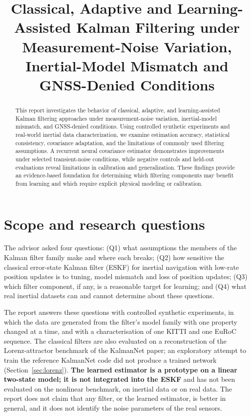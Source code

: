 \documentclass[11pt,a4paper]{article}
\title{Classical, Adaptive and Learning-Assisted Kalman Filtering under Measurement-Noise
Variation, Inertial-Model Mismatch and GNSS-Denied Conditions}
\author{}
\date{}
\begin{document}
\maketitle

\begin{abstract}
This report investigates the behavior of classical, adaptive, and learning-assisted Kalman
filtering approaches under measurement-noise variation, inertial-model mismatch, and GNSS-denied
conditions. Using controlled synthetic experiments and real-world inertial data characterization,
we examine estimation accuracy, statistical consistency, covariance adaptation, and the
limitations of commonly used filtering assumptions. A recurrent neural covariance estimator
demonstrates improvements under selected transient-noise conditions, while negative controls and
held-out evaluations reveal limitations in calibration and generalization. These findings
provide an evidence-based foundation for determining which filtering components may benefit from
learning and which require explicit physical modeling or calibration.
\end{abstract}

\section{Scope and research questions}\label{sec:scope}

The advisor asked four questions: (Q1) what assumptions the members of the Kalman filter family
make and where each breaks; (Q2) how sensitive the classical error-state Kalman filter (ESKF) for
inertial navigation with low-rate position updates is to tuning, model mismatch and loss of
position updates; (Q3) which filter component, if any, is a reasonable target for learning; and
(Q4) what real inertial datasets can and cannot determine about these questions.

The report answers these questions with controlled synthetic experiments, in which the data are
generated from the filter's model family with one property changed at a time, and with a
characterisation of one KITTI and one EuRoC sequence. The classical filters are also evaluated on a
reconstruction of the Lorenz-attractor benchmark of the KalmanNet paper; an exploratory attempt to
train the reference KalmanNet code did not produce a trained network (Section~\ref{sec:lorenz}).
\textbf{The learned estimator is a prototype on
a linear two-state model; it is not integrated into the ESKF} and has not been evaluated on the
nonlinear benchmark, on inertial data or on real data. The report does not claim that any filter, or
the learned estimator, is better in general, and it does not identify the noise parameters of the
real sensors.
\end{document}
